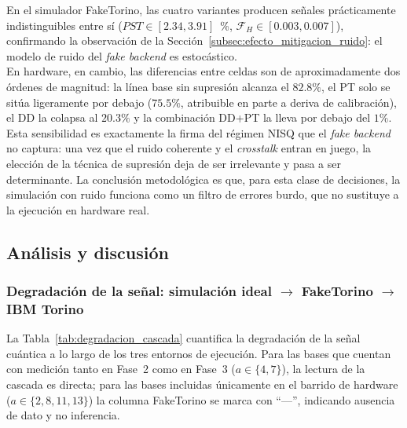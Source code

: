 \documentclass[12pt, spanish]{book}
\begin{document}
En el simulador FakeTorino, las cuatro variantes producen señales prácticamente indistinguibles entre sí ($PST \in [2.34, 3.91]$~\%, $\mathcal{F}_H \in [0.003, 0.007]$), confirmando la observación de la Sección~\ref{subsec:efecto_mitigacion_ruido}: el modelo de ruido del \textit{fake backend} es estocástico.\\

En hardware, en cambio, las diferencias entre celdas son de aproximadamente dos órdenes de magnitud: la línea base sin supresión alcanza el $82.8\%$, el PT solo se sitúa ligeramente por debajo ($75.5\%$, atribuible en parte a deriva de calibración), el DD la colapsa al $20.3\%$ y la combinación DD+PT la lleva por debajo del $1\%$. Esta sensibilidad es exactamente la firma del régimen NISQ que el \textit{fake backend} no captura: una vez que el ruido coherente y el \textit{crosstalk} entran en juego, la elección de la técnica de supresión deja de ser irrelevante y pasa a ser determinante. La conclusión metodológica es que, para esta clase de decisiones, la simulación con ruido funciona como un filtro de errores burdo, que no sustituye a la ejecución en hardware real.

\subsection{Análisis y discusión}
\label{subsec:discusion_hardware}

\subsubsection{Degradación de la señal: simulación ideal $\to$ FakeTorino $\to$ IBM Torino}

La Tabla~\ref{tab:degradacion_cascada} cuantifica la degradación de la señal cuántica a lo largo de los tres entornos de ejecución. Para las bases que cuentan con medición tanto en Fase~2 como en Fase~3 ($a \in \{4, 7\}$), la lectura de la cascada es directa; para las bases incluidas únicamente en el barrido de hardware ($a \in \{2, 8, 11, 13\}$) la columna FakeTorino se marca con ``---'', indicando ausencia de dato y no inferencia.
\end{document}
